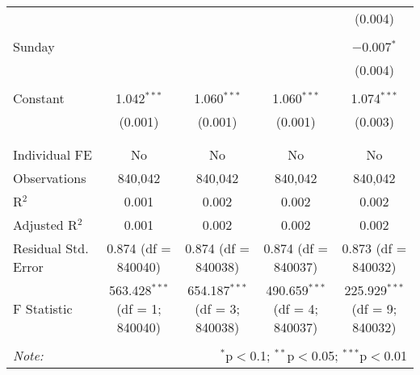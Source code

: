 \documentclass[
]{article}
\begin{document}
\begin{table}[!htbp]
{\begin{tabular}{@{\extracolsep{5pt}}lcccc}
  &  &  &  & (0.004) \\ 
  & & & & \\ 
 Sunday &  &  &  & $-$0.007$^{*}$ \\ 
  &  &  &  & (0.004) \\ 
  & & & & \\ 
 Constant & 1.042$^{***}$ & 1.060$^{***}$ & 1.060$^{***}$ & 1.074$^{***}$ \\ 
  & (0.001) & (0.001) & (0.001) & (0.003) \\ 
  & & & & \\ 
\hline \\[-1.8ex] 
Individual FE & No & No & No & No \\ 
Observations & 840,042 & 840,042 & 840,042 & 840,042 \\ 
R$^{2}$ & 0.001 & 0.002 & 0.002 & 0.002 \\ 
Adjusted R$^{2}$ & 0.001 & 0.002 & 0.002 & 0.002 \\ 
Residual Std. Error & 0.874 (df = 840040) & 0.874 (df = 840038) & 0.874 (df = 840037) & 0.873 (df = 840032) \\ 
F Statistic & 563.428$^{***}$ (df = 1; 840040) & 654.187$^{***}$ (df = 3; 840038) & 490.659$^{***}$ (df = 4; 840037) & 225.929$^{***}$ (df = 9; 840032) \\ 
\hline 
\hline \\[-1.8ex] 
\textit{Note:}  & \multicolumn{4}{r}{$^{*}$p$<$0.1; $^{**}$p$<$0.05; $^{***}$p$<$0.01} \\ 
\end{tabular}
} 
\end{table} 
\newpage
\end{document}
